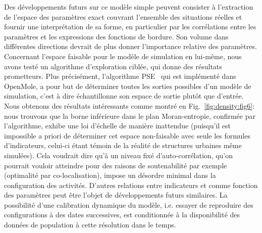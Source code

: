 {Des développements futurs sur ce modèle simple peuvent consister à l'extraction de l'espace des paramètres exact couvrant l'ensemble des situations réelles et fournir une interprétation de sa forme, en particulier par les corrélations entre les paramètres et les expressions des fonctions de bordure. Son volume dans différentes directions devrait de plus donner l'importance relative des paramètres. Concernant l'espace faisable pour le modèle de simulation en lui-même, nous avons testé un algorithme d'exploration ciblée, qui donne des résultats prometteurs. Plus précisément, l'algorithme PSE~\cite{10.1371/journal.pone.0138212} qui est implémenté dans OpenMole, a pour but de déterminer toutes les sorties possibles d'un modèle de simulation, c'est à dire échantillonne son espace de sortie plutôt que d'entrée. Nous obtenons des résultats intéressants comme montré en Fig.~\ref{fig:density:fig6}: nous trouvons que la borne inférieure dans le plan Moran-entropie, confirmée par l'algorithme, exhibe une loi d'échelle de manière inattendue (puisqu'il est impossible a priori de déterminer cet espace non-faisable avec seule les formules d'indicateurs, celui-ci étant témoin de la réalité de structures urbaines même simulées). Cela voudrait dire qu'à un niveau fixé d'auto-corrélation, qu'on pourrait vouloir atteindre pour des raisons de soutenabilité par exemple (optimalité par co-localisation), impose un désordre minimal dans la configuration des activités. D'autres relations entre indicateurs et comme fonction des paramètres peut être l'objet de développements futurs similaires. La possibilité d'une calibration dynamique du modèle, i.e. essayer de reproduire des configurations à des dates successives, est conditionnée à la disponibilité des données de population à cette résolution dans le temps.
}


